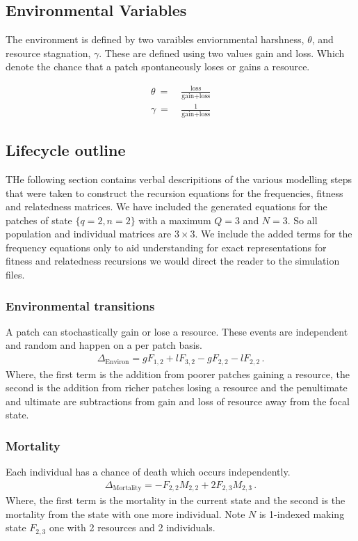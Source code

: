 \subsection{Environmental Variables}
The environment is defined by two varaibles enviornmental harshness, $\theta$, and resource stagnation, $\gamma$. These are defined using two values gain and loss. Which denote the chance that a patch spontaneously loses or  gains a resource. 

\begin{align}
    \theta\ =&\ \frac{\text{loss}}{\text{gain} + \text{loss}} \\
    \gamma\ =&\ \frac{1}{\text{gain} + \text{loss}}
\end{align}

\subsection{Lifecycle outline}
THe following section contains verbal descripitions of the various modelling steps that were taken to construct the recursion equations for the frequencies, fitness and relatedness matrices. We have included the generated equations for the patches of state $\{q=2, n=2\}$ with a maximum $Q=3$ and $N=3$. So all population and individual matrices are $3\times 3$. We include the added terms for the frequency equations only to aid understanding for exact representations for fitness and relatedness recursions we would direct the reader to the simulation files.

\subsubsection{Environmental transitions}
A patch can stochastically gain or lose a resource. These events are independent and random and happen on a per patch basis.
\begin{align}
    \Delta_{\text{Environ}} = g F_{1,2} + l F_{3,2} - g F_{2,2} - l F_{2,2}\,.
\end{align}
Where, the first term is the addition from poorer patches gaining a resource, the second is the addition from richer patches losing a resource and the penultimate and ultimate are subtractions from gain and loss of resource away from the focal state.

\subsubsection{Mortality}
Each individual has a chance of death which occurs independently.
\begin{align}
   \Delta_{\text{Mortality}} = - F_{2,2} M_{2,2} + 2 F_{2,3} M_{2,3}\, .
\end{align}
Where, the first term is the mortality in the current state and the second is the mortality from the state with one more individual. Note $N$ is 1-indexed making state $F_{2,3}$ one with 2 resources and 2 individuals.

